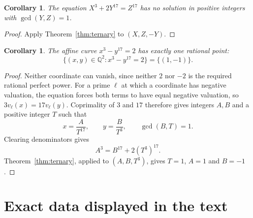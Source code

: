 \documentclass[11pt,a4paper]{article}
\newtheorem{corollary}[theorem]{Corollary}
\theoremstyle{definition}\newtheorem{definition}[theorem]{Definition}
\theoremstyle{remark}\newtheorem{remark}[theorem]{Remark}
\begin{document}
\begin{corollary}\label{cor:other}
The equation $X^3+2Y^{17}=Z^{17}$ has no solution in positive integers with $\gcd(Y,Z)=1$.
\end{corollary}
\begin{proof}
Apply Theorem~\ref{thm:ternary} to $(X,Z,-Y)$.
\end{proof}

\begin{corollary}\label{cor:rational}
The affine curve $x^3-y^{17}=2$ has exactly one rational point:
\[
\{(x,y)\in\mathbb Q^2:x^3-y^{17}=2\}=\{(1,-1)\}.
\]
\end{corollary}
\begin{proof}
Neither coordinate can vanish, since neither $2$ nor $-2$ is the required rational perfect power. For a prime $\ell$ at which a coordinate has negative valuation, the equation forces both terms to have equal negative valuation, so $3v_\ell(x)=17v_\ell(y)$. Coprimality of $3$ and $17$ therefore gives integers $A,B$ and a positive integer $T$ such that
\[
x=\frac A{T^{17}},\qquad y=\frac B{T^3},\qquad\gcd(B,T)=1.
\]
Clearing denominators gives
\[
A^3=B^{17}+2(T^3)^{17}.
\]
Theorem~\ref{thm:ternary}, applied to $(A,B,T^3)$, gives $T=1$, $A=1$ and $B=-1$.
\end{proof}


\appendix
\setcounter{table}{0}
\section{Exact data displayed in the text}

\end{document}
